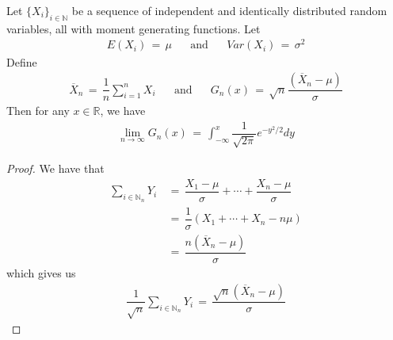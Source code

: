 \begin{theorem}
    Let $\{X_{i}\}_{i \in \mathbb{N}}$ be a sequence of independent and identically distributed random variables, all with moment generating functions. Let
    \begin{align*}
        E(X_{i}) \hspace{2pt} = \hspace{2pt} \mu \hspace{20pt} \text{and} \hspace{20pt} Var(X_{i}) \hspace{2pt} = \hspace{2pt} \sigma^{2}
    \end{align*}
    Define 
    \begin{align*}
        \overline{X}_{n} \hspace{2pt} = \hspace{2pt} \dfrac{1}{n} \sum_{i = 1}^{n} X_{i} \hspace{20pt} \text{and} \hspace{20pt} G_{n}(x) \hspace{2pt} = \hspace{2pt} \sqrt{n}\dfrac{(\overline{X}_{n} - \mu)}{\sigma}
    \end{align*}
    Then for any $x \in \mathbb{R}$, we have
    \begin{align*}
        \lim_{n \longrightarrow \infty} G_{n}(x) \hspace{2pt} = \hspace{2pt} \int_{-\infty}^{x} \dfrac{1}{\sqrt{2 \pi}} e^{-y^{2}/2} dy
    \end{align*}
    \begin{proof}
        We have that
        \begin{align*}
            \sum_{i \in \mathbb{N}_{n}} Y_{i} \hspace{2pt} &= \hspace{2pt} \dfrac{X_{1} - \mu}{\sigma} + \cdots + \dfrac{X_{n} - \mu}{\sigma} \\[1ex]
            &= \hspace{2pt} \dfrac{1}{\sigma} (X_{1} + \cdots + X_{n} - n\mu) \\[1ex]
            &= \hspace{2pt} \dfrac{n(\overline{X}_{n} - \mu)}{\sigma}
        \end{align*}
        which gives us
        \begin{align*}
            \dfrac{1}{\sqrt{n}} \sum_{i \in \mathbb{N}_{n}} Y_{i} \hspace{2pt} = \hspace{2pt} \dfrac{\sqrt{n}(\overline{X}_{n} - \mu)}{\sigma}

\end{align*}
\end{proof}
\end{theorem}
